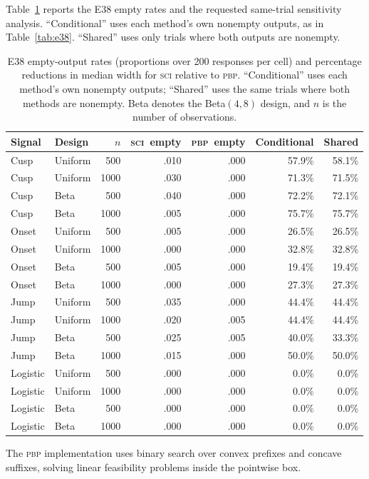 \documentclass{interact}
\theoremstyle{definition}
\theoremstyle{remark}
\newcommand{\SCI}{\textnormal{\textsc{sci}}\xspace}
\newcommand{\PBP}{\textnormal{\textsc{pbp}}\xspace}
\begin{document}
Table~\ref{tab:shared-nonempty} reports the E38 empty rates and the requested
same-trial sensitivity analysis.  ``Conditional'' uses each method's own
nonempty outputs, as in Table~\ref{tab:e38}.  ``Shared'' uses only trials where
both outputs are nonempty.

\begin{table}[htbp]
\centering
\caption{E38 empty-output rates (proportions over 200 responses per cell) and
percentage reductions in median width for \SCI relative to \PBP.
``Conditional'' uses each method's own nonempty outputs; ``Shared'' uses the
same trials where both methods are nonempty.  Beta denotes the Beta$(4,8)$
design, and $n$ is the number of observations.}
\label{tab:shared-nonempty}
\scriptsize
\setlength{\tabcolsep}{4.2pt}
\begin{tabular}{llrrrrr}
\toprule
Signal & Design & $n$ & \SCI\ empty & \PBP\ empty & Conditional & Shared\\
\midrule
Cusp & Uniform & 500  & .010 & .000 & 57.9\% & 58.1\%\\
Cusp & Uniform & 1000 & .030 & .000 & 71.3\% & 71.5\%\\
Cusp & Beta & 500  & .040 & .000 & 72.2\% & 72.1\%\\
Cusp & Beta & 1000 & .005 & .000 & 75.7\% & 75.7\%\\
Onset & Uniform & 500  & .005 & .000 & 26.5\% & 26.5\%\\
Onset & Uniform & 1000 & .000 & .000 & 32.8\% & 32.8\%\\
Onset & Beta & 500  & .005 & .000 & 19.4\% & 19.4\%\\
Onset & Beta & 1000 & .000 & .000 & 27.3\% & 27.3\%\\
Jump & Uniform & 500  & .035 & .000 & 44.4\% & 44.4\%\\
Jump & Uniform & 1000 & .020 & .005 & 44.4\% & 44.4\%\\
Jump & Beta & 500  & .025 & .005 & 40.0\% & 33.3\%\\
Jump & Beta & 1000 & .015 & .000 & 50.0\% & 50.0\%\\
Logistic & Uniform & 500  & .000 & .000 & 0.0\% & 0.0\%\\
Logistic & Uniform & 1000 & .000 & .000 & 0.0\% & 0.0\%\\
Logistic & Beta & 500  & .000 & .000 & 0.0\% & 0.0\%\\
Logistic & Beta & 1000 & .000 & .000 & 0.0\% & 0.0\%\\
\bottomrule
\end{tabular}
\end{table}
The \PBP implementation uses binary search over convex prefixes and concave
suffixes, solving linear feasibility problems inside the pointwise box.
\FloatBarrier
\end{document}
